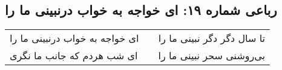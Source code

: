 \begin{center}
\section*{رباعی شماره ۱۹: ای خواجه به خواب درنبینی ما را}
\label{sec:0019}
\begin{longtable}{l p{0.5cm} r}
ای خواجه به خواب درنبینی ما را
&&
تا سال دگر دگر نبینی ما را
\\
ای شب هردم که جانب ما نگری
&&
بی‌روشنی سحر نبینی ما را
\\
\end{longtable}
\end{center}
